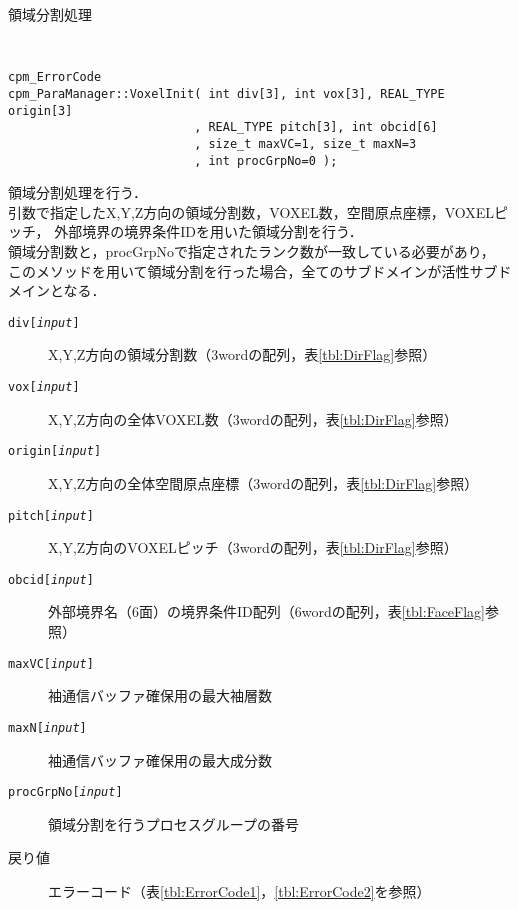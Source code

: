 \begin{spacing}{0.8}
\begin{itembox}[l]{領域分割処理}
{\tt
\begin{verbatim}
cpm_ErrorCode
cpm_ParaManager::VoxelInit( int div[3], int vox[3], REAL_TYPE origin[3]
                          , REAL_TYPE pitch[3], int obcid[6]
                          , size_t maxVC=1, size_t maxN=3
                          , int procGrpNo=0 );
\end{verbatim}
}
領域分割処理を行う．\\
引数で指定したX,Y,Z方向の領域分割数，VOXEL数，空間原点座標，VOXELピッチ，
外部境界の境界条件IDを用いた領域分割を行う．\\
領域分割数と，procGrpNoで指定されたランク数が一致している必要があり，
このメソッドを用いて領域分割を行った場合，全てのサブドメインが活性サブドメインとなる．
\begin{description}
\item[{\tt div[{\it input}]}] X,Y,Z方向の領域分割数（3wordの配列，表\ref{tbl:DirFlag}参照）
\item[{\tt vox[{\it input}]}] X,Y,Z方向の全体VOXEL数（3wordの配列，表\ref{tbl:DirFlag}参照）
\item[{\tt origin[{\it input}]}] X,Y,Z方向の全体空間原点座標（3wordの配列，表\ref{tbl:DirFlag}参照）
\item[{\tt pitch[{\it input}]}] X,Y,Z方向のVOXELピッチ（3wordの配列，表\ref{tbl:DirFlag}参照）
\item[{\tt obcid[{\it input}]}] 外部境界名（6面）の境界条件ID配列（6wordの配列，表\ref{tbl:FaceFlag}参照）
\item[{\tt maxVC[{\it input}]}] 袖通信バッファ確保用の最大袖層数
\item[{\tt maxN[{\it input}]}] 袖通信バッファ確保用の最大成分数
\item[{\tt procGrpNo[{\it input}]}] 領域分割を行うプロセスグループの番号
\\
\item[戻り値] エラーコード（表\ref{tbl:ErrorCode1}，\ref{tbl:ErrorCode2}を参照）
\end{description}
\end{itembox}\\
\end{spacing}

